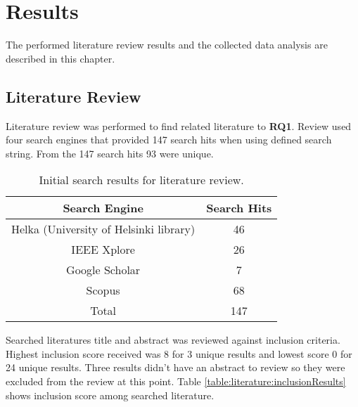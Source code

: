 \chapter{Results\label{results}}
The performed literature review results and the collected data analysis are described in this chapter.

\section{Literature Review}
Literature review was performed to find related literature to \textbf{RQ1}.
Review used four search engines that provided 147 search hits when using defined search string.
From the 147 search hits 93 were unique.
\begin{table}[ht!]
    \begin{tabular}{|c c|} 
        \hline
        Search Engine
        & Search Hits
        \\ 
        \hline\hline
        Helka (University of Helsinki library)
        & 46
        \\ 
        
        IEEE Xplore
        & 26
        \\ 
        
        Google Scholar
        & 7
        \\ 
        
        Scopus
        & 68
        \\ 
        \hline
        Total
        & 147
        \\ 
        \hline
    \end{tabular}    
    \caption{Initial search results for literature review.}
    \label{table:literature:initialSearchResults}
\end{table}
Searched literatures title and abstract was reviewed against inclusion criteria.
Highest inclusion score received was 8 for 3 unique results and lowest score 0 for 24 unique results.
Three results didn't have an abstract to review so they were excluded from the review at this point.
Table \ref{table:literature:inclusionResults} shows inclusion score among searched literature.
